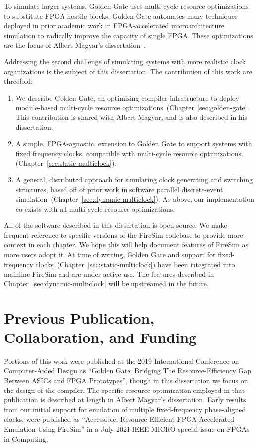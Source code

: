 To simulate larger systems, Golden Gate uses multi-cycle resource optimizations
to substitute FPGA-hostile blocks. Golden Gate automates many techniques
deployed in prior academic work in FPGA-accelerated microarchitecture
simulation to radically improve the capacity of single FPGA. These
optimizations are the focus of Albert Magyar's dissertation~\cite{MagyarDissertation}.

Addressing the second challenge of simulating systems with more realistic clock
organizations is the subject of this dissertation. The contribution of this
work are threefold:

\begin{enumerate}
\item We describe Golden Gate, an optimizing compiler infratructure to deploy module-based
    multi-cycle resource optimizations~(Chapter~\ref{sec:golden-gate}. This
    contribution is shared with Albert Magyar, and is also described in his
    dissertation.

\item A simple, FPGA-agnostic, extension to Golden Gate to support systems
    with fixed frequency clocks, compatible with multi-cycle resource optimizations. (Chapter~\ref{sec:static-multiclock}).

\item A general, distributed approach for simulating clock generating and switching structures,
    based off of  prior work in software parallel discrete-event
    simulation~(Chapter~\ref{sec:dynamic-multiclock}). As above, our
    implementation co-exists with all multi-cycle resource
    optimizations.
\end{enumerate}

All of the software described in this dissertation is open source. We make
frequent reference to specific versions of the FireSim codebase to provide more
context in each chapter. We hope this will help document features of FireSim as
more users adopt it. At time of writing, Golden Gate and support for
fixed-frequency clocks~(Chapter~\ref{sec:static-multiclock}) have been
integrated into mainline FireSim and are under active use. The features
described in Chapter~\ref{sec:dynamic-multiclock} will be upstreamed in the
future.

\section{Previous Publication, Collaboration, and Funding}

Portions of this work were published at the 2019 International Conference on
Computer-Aided Design as ``Golden Gate: Bridging The Resource-Efficiency Gap
Between ASICs and FPGA Prototypes'', though in this dissertation we focus on
the design of the compiler. The specific resource optimization employed in that
publication is described at length in Albert Magyar's dissertation.  Early results
from our initial support for emulation of multiple fixed-frequency
phase-aligned clocks, were published as ``Accessible, Resource-Efficient
FPGA-Accelerated Emulation Using FireSim'' in a July 2021 IEEE MICRO special
issue on FPGAs in Computing.

